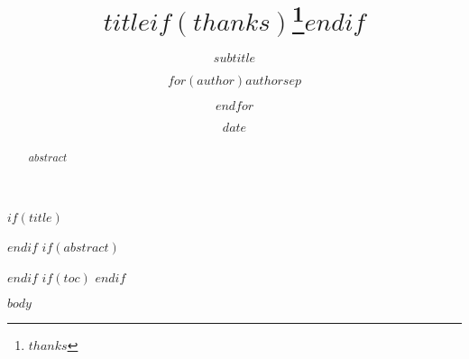 \documentclass[10pt]{article}
\title{$title$$if(thanks)$\thanks{$thanks$}$endif$}
\subtitle{$subtitle$}
\author{$for(author)$$author$$sep$ \and $endfor$}
\institute{$for(institute)$$institute$$sep$ \and $endfor$}
\date{$date$}
\begin{document}
$if(title)$
\maketitle
$endif$
$if(abstract)$
\begin{abstract}
$abstract$
\end{abstract}
$endif$
$if(toc)$
\tableofcontents
\newpage
$endif$

$body$
\end{document}
